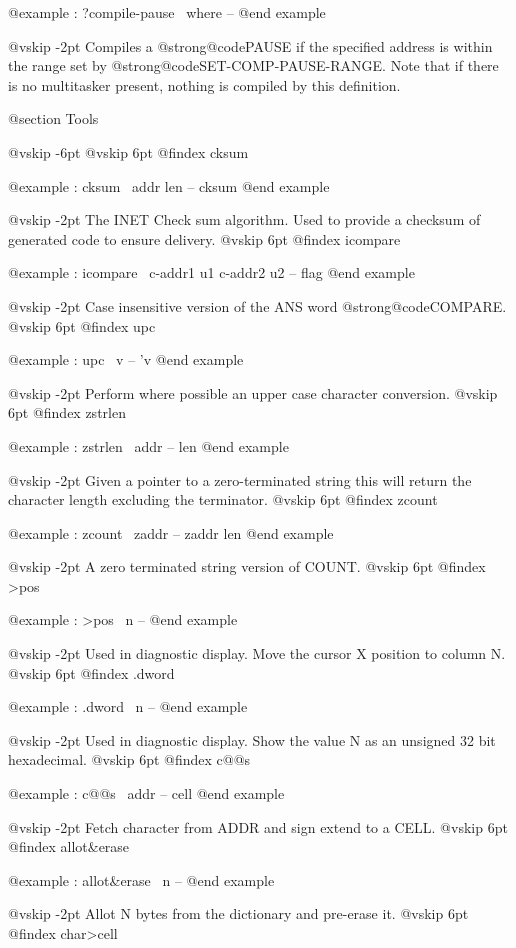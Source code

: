 @example
: ?compile-pause        \ where -- @end example

@vskip -2pt
Compiles a @strong{@code{PAUSE}} if the specified address is within the
range set by @strong{@code{SET-COMP-PAUSE-RANGE}}. Note that if there
is no multitasker present, nothing is compiled by this definition.

@section Tools


@vskip -6pt
@vskip 6pt
@findex cksum

@example
: cksum         \ addr len -- cksum @end example

@vskip -2pt
The INET Check sum algorithm. Used to provide a checksum of
generated code to ensure delivery.
@vskip 6pt
@findex icompare

@example
: icompare      \ c-addr1 u1 c-addr2 u2 -- flag @end example

@vskip -2pt
Case insensitive version of the ANS word @strong{@code{COMPARE}}.
@vskip 6pt
@findex upc

@example
: upc           \ v -- 'v @end example

@vskip -2pt
Perform where possible an upper case character conversion.
@vskip 6pt
@findex zstrlen

@example
: zstrlen       \ addr -- len @end example

@vskip -2pt
Given a pointer to a zero-terminated string this will return the
character length excluding the terminator.
@vskip 6pt
@findex zcount

@example
: zcount        \ zaddr -- zaddr len @end example

@vskip -2pt
A zero terminated string version of COUNT.
@vskip 6pt
@findex >pos

@example
: >pos          \ n -- @end example

@vskip -2pt
Used in diagnostic display. Move the cursor X position to column N.
@vskip 6pt
@findex .dword

@example
: .dword        \ n -- @end example

@vskip -2pt
Used in diagnostic display. Show the value N as an unsigned
32 bit hexadecimal.
@vskip 6pt
@findex c@@s

@example
: c@@s           \ addr -- cell @end example

@vskip -2pt
Fetch character from ADDR and sign extend to a CELL.
@vskip 6pt
@findex allot&erase

@example
: allot&erase   \ n -- @end example

@vskip -2pt
Allot N bytes from the dictionary and pre-erase it.
@vskip 6pt
@findex char>cell

